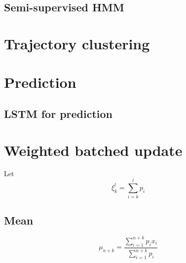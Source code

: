 \documentclass[a4paper, 11pt]{article}
\begin{document}
\subsection{Semi-supervised HMM}

\section{Trajectory clustering}


\section{Prediction}

\subsection{LSTM for prediction}


\section{Weighted batched update}

Let
\begin{displaymath}
  \xi_k^l = \sum_{i = k}^{l} p_i
\end{displaymath}

\subsection{Mean}

\begin{displaymath}
  \mu_{n + k} = \dfrac{\sum_{i = 1}^{n+k} p_i x_i}{\sum_{i = 1}^{n+k} p_i}
\end{displaymath}


\end{document}
